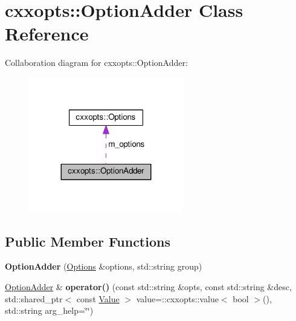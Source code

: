 \hypertarget{classcxxopts_1_1OptionAdder}{}\section{cxxopts\+:\+:Option\+Adder Class Reference}
\label{classcxxopts_1_1OptionAdder}


Collaboration diagram for cxxopts\+:\+:Option\+Adder\+:
\nopagebreak
\begin{figure}[H]
\begin{center}
\leavevmode
\includegraphics[width=191pt]{classcxxopts_1_1OptionAdder__coll__graph}
\end{center}
\end{figure}
\subsection*{Public Member Functions}
\begin{DoxyCompactItemize}
\item 
{\bfseries Option\+Adder} (\hyperlink{classcxxopts_1_1Options}{Options} \&options, std\+::string group)\hypertarget{classcxxopts_1_1OptionAdder_ac9da55d72245e55eed70486200a60728}{}\label{classcxxopts_1_1OptionAdder_ac9da55d72245e55eed70486200a60728}

\item 
\hyperlink{classcxxopts_1_1OptionAdder}{Option\+Adder} \& {\bfseries operator()} (const std\+::string \&opts, const std\+::string \&desc, std\+::shared\+\_\+ptr$<$ const \hyperlink{classcxxopts_1_1Value}{Value} $>$ value=\+::cxxopts\+::value$<$ bool $>$(), std\+::string arg\+\_\+help=\char`\"{}\char`\"{})\hypertarget{classcxxopts_1_1OptionAdder_a368dc6bff478b4eb39185a8f0e90ef9a}{}\label{classcxxopts_1_1OptionAdder_a368dc6bff478b4eb39185a8f0e90ef9a}

\end{DoxyCompactItemize}
